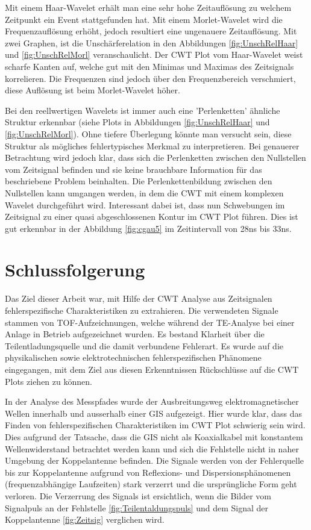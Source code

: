 \begin{refsection}
Mit einem Haar-Wavelet erhält man eine sehr hohe Zeitauflösung zu welchem Zeitpunkt ein Event stattgefunden hat.
Mit einem Morlet-Wavelet wird die Frequenzauflösung erhöht, jedoch resultiert eine ungenauere Zeitauflösung.
Mit zwei Graphen, ist die Unschärferelation in den Abbildungen \ref{fig:UnschRelHaar} und \ref{fig:UnschRelMorl} veranschaulicht. 
Der CWT Plot vom Haar-Wavelet weist scharfe Kanten auf, welche gut mit den Minimas und Maximas des Zeitsignals korrelieren.
Die Frequenzen sind jedoch über den Frequenzbereich verschmiert, diese Auflösung ist beim Morlet-Wavelet höher.

Bei den reellwertigen Wavelets ist immer auch eine 'Perlenketten' ähnliche Struktur erkennbar (siehe Plots in Abbildungen \ref{fig:UnschRelHaar} und \ref{fig:UnschRelMorl}).
Ohne tiefere Überlegung könnte man versucht sein, diese Struktur als mögliches fehlertypisches Merkmal zu interpretieren. 
Bei genauerer Betrachtung wird jedoch klar, dass sich die Perlenketten zwischen den Nullstellen vom Zeitsignal befinden und sie keine brauchbare Information für das beschriebene Problem beinhalten.
Die Perlenkettenbildung zwischen den Nullstellen kann umgangen werden, in dem die CWT mit einem komplexen Wavelet durchgeführt wird.
Interessant dabei ist, dass nun Schwebungen im Zeitsignal zu einer quasi abgeschlossenen Kontur im CWT Plot führen.
Dies ist gut erkennbar in der Abbildung \ref{fig:cgau5} im Zeitintervall von 28ns bis 33ns.

\section{Schlussfolgerung}
Das Ziel dieser Arbeit war, mit Hilfe der CWT Analyse aus Zeitsignalen fehlerspezifische Charakteristiken zu extrahieren.
Die verwendeten Signale stammen von TOF-Aufzeichnungen, welche während der TE-Analyse bei einer Anlage in Betrieb aufgezeichnet wurden.
Es bestand Klarheit über die Teilentladungsquelle und die damit verbundene Fehlerart. 
Es wurde auf die physikalischen sowie elektrotechnischen fehlerspezifischen Phänomene eingegangen, mit dem Ziel aus diesen Erkenntnissen Rückschlüsse auf die CWT Plots ziehen zu können.

In der Analyse des Messpfades wurde der Ausbreitungsweg elektromagnetischer Wellen innerhalb und ausserhalb einer GIS aufgezeigt.
Hier wurde klar, dass das Finden von fehlerspezifischen Charakteristiken im CWT Plot schwierig sein wird.
Dies aufgrund der Tatsache, dass die GIS nicht als Koaxialkabel mit konstantem Wellenwiderstand betrachtet werden kann und sich die Fehlstelle nicht in naher Umgebung der Koppelantenne befinden.
Die Signale werden von der Fehlerquelle bis zur Koppelantenne aufgrund von Reflexions- und Dispersionsphänomenen (frequenzabhängige Laufzeiten) stark verzerrt und die ursprüngliche Form geht verloren.
Die Verzerrung des Signals ist ersichtlich, wenn die Bilder vom Signalpuls an der Fehlstelle \ref{fig:Teilentaldungspuls} und dem Signal der Koppelantenne \ref{fig:Zeitsig} verglichen wird.


\end{refsection}
